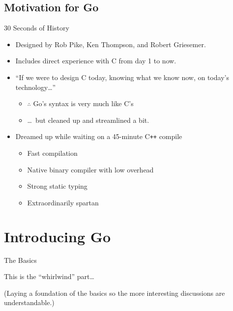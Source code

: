 \documentclass[pdf,t]{beamer}
\begin{document}
\subsection{Motivation for Go}
\begin{frame}{30 Seconds of History}
    \begin{itemize}
        \item Designed by Rob Pike, Ken Thompson, and Robert Griesemer.
        \item Includes direct experience with C from day 1 to now.
            \pause
        \item ``If we were to design C today, knowing what we know now, on today's technology\dots''
            \pause
            \begin{itemize}
        \item $\therefore$ Go's syntax is very much like C's
        \item \dots\ but cleaned up and streamlined a bit.
            \end{itemize}
        \pause
    \item Dreamed up while waiting on a 45-minute C\texttt{++} compile
        \pause
            \begin{itemize}
                \item Fast compilation
                \item Native binary compiler with low overhead
                \item Strong static typing
                \item Extraordinarily spartan
            \end{itemize}
    \end{itemize}
\end{frame}
\section{Introducing Go}
\begin{frame}[c]{The Basics}
	\begin{center}
	\Huge This is the ``whirlwind'' part\dots

		\bigskip

	\Large (Laying a foundation of the basics so the more interesting discussions are understandable.)
	\end{center}
\end{frame}
\end{document}
